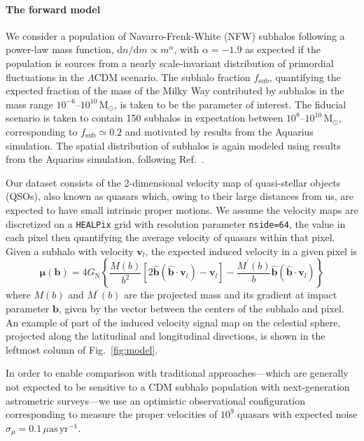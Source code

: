 \documentclass[]{article}
\begin{document}
\paragraph{The forward model} We consider a population of Navarro-Frenk-White (NFW) subhalos following a power-law mass function, $\mathrm dn / \mathrm dm \propto m^\alpha$, with $\alpha = -1.9$ as expected if the population is sources from a nearly scale-invariant distribution of primordial fluctuations in the $\Lambda$CDM scenario. 
The subhalo fraction $f_\mathrm{sub}$, quantifying the expected fraction of the mass of the Milky Way contributed by subhalos in the mass range $10^{-6}$--$10^{10}\,\mathrm{M}_\odot$, is taken to be the parameter of interest. The fiducial scenario is taken to contain 150 subhalos in expectation between $10^{8}$--$10^{10}\,\mathrm{M}_\odot$, corresponding to $f_\mathrm{sub} \simeq 0.2$ and motivated by results from the Aquarius simulation. The spatial distribution of subhalos is again modeled using results from the Aquarius simulation, following Ref.~\cite{}.

Our dataset consists of the 2-dimensional velocity map of quasi-stellar objects (QSOs), also known as quasars which, owing to their large distances from us, are expected to have small intrinsic proper motions. We assume the velocity maps are discretized on a \texttt{HEALPix} grid with resolution parameter \texttt{nside=64}, the value in each pixel then quantifying the average velocity of quasars within that pixel. Given a subhalo with velocity $\mathbf{v}_{l}$, the expected induced velocity in a given pixel is
\begin{equation}
    \boldsymbol{\mu}(\mathbf{b})=4 G_{\mathrm{N}}\left\{\frac{M(b)}{b^{2}}\left[2 \hat{\mathbf{b}}\left(\hat{\mathbf{b}} \cdot \mathbf{v}_{l}\right)-\mathbf{v}_{l}\right]-\frac{M^{\prime}(b)}{b} \hat{\mathbf{b}}\left(\hat{\mathbf{b}} \cdot \mathbf{v}_{l}\right)\right\}
\end{equation}
where $M(b)$ and $M^{\prime}(b)$ are the projected mass and its gradient at impact parameter $\mathbf{b}$, given by the vector between the centers of the subhalo and pixel. An example of part of the induced velocity signal map on the celestial sphere, projected along the latitudinal and longitudinal directions, is shown in the leftmost column of Fig.~\ref{fig:model}.

In order to enable comparison with traditional approaches---which are generally not expected to be sensitive to a CDM subhalo population with next-generation astrometric surveys---we use an optimistic observational configuration corresponding to measure the proper velocities of $10^9$ quasars with expected noise $\sigma_{\mu} = 0.1\,\mu\mathrm{as}\,\mathrm{yr}^{-1}$.
\end{document}
